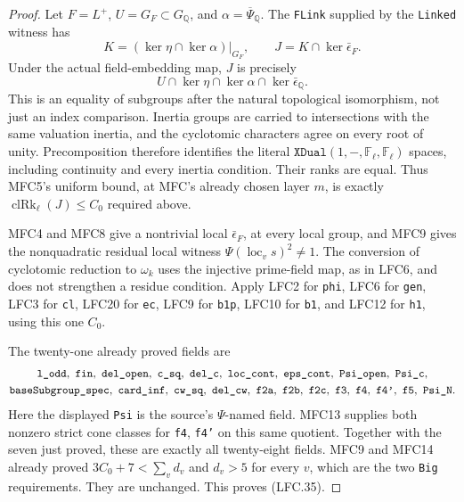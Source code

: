 \documentclass[11pt,a4paper]{article}
\numberwithin{equation}{section}
\theoremstyle{remark}\newtheorem{remark}[theorem]{Remark}
\begin{document}
\begin{proof}
Let \(F=L^+\), \(U=G_F\subset G_{\mathbb Q}\), and
\(\alpha=\overline\Psi_{\mathbb Q}\).
The \texttt{FLink} supplied by the \texttt{Linked} witness
has
\[
 K=(\ker\eta\cap\ker\alpha)|_{G_F},\qquad
 J=K\cap\ker\bar\epsilon_F.
 \]
Under the actual field-embedding map, \(J\) is precisely
\[
     U\cap\ker\eta\cap\ker\alpha\cap\ker\bar\epsilon_{\mathbb Q}.
                                                        \tag{LFC.36}
\]
This is an equality of subgroups after the natural
topological isomorphism, not just an index comparison.
Inertia groups are carried to intersections with the
same valuation inertia, and the cyclotomic characters
agree on every root of unity.  Precomposition therefore
identifies the literal \(\texttt{XDual}(1,-,\mathbb F_\ell,
\mathbb F_\ell)\) spaces, including continuity and
every inertia condition.
Their ranks are equal.  Thus MFC5's uniform bound,
at MFC's already chosen layer \(m\), is exactly
\(\operatorname{clRk}_\ell(J)\le C_0\) required above.

MFC4 and MFC8 give a nontrivial local
\(\bar\epsilon_F\), at every local group, and MFC9
gives the nonquadratic residual local witness
\(\Psi(\operatorname{loc}_v s)^2\ne1\).
The conversion of cyclotomic reduction to
\(\omega_k\) uses the injective prime-field map,
as in LFC6, and does not strengthen a residue condition.
Apply LFC2 for \texttt{phi}, LFC6 for \texttt{gen},
LFC3 for \texttt{cl}, LFC20 for \texttt{ec},
LFC9 for \texttt{b1p}, LFC10 for \texttt{b1},
and LFC12 for \texttt{h1}, using this one \(C_0\).

The twenty-one already proved fields are
\[
 \begin{gathered}
 \texttt{l\_\allowbreak odd},\ \texttt{fin},\ \texttt{del\_\allowbreak open},\
 \texttt{c\_\allowbreak sq},\ \texttt{del\_\allowbreak c},\ \texttt{loc\_\allowbreak cont},\
 \texttt{eps\_\allowbreak cont},\ \texttt{Psi\_\allowbreak open},\ \texttt{Psi\_\allowbreak c},\\
 \texttt{base\allowbreak Subgroup\_\allowbreak spec},\ \texttt{card\_\allowbreak inf},\
 \texttt{cw\_\allowbreak sq},\ \texttt{del\_\allowbreak cw},\
 \texttt{f2a},\ \texttt{f2b},\ \texttt{f2c},\
 \texttt{f3},\ \texttt{f4},\ \texttt{f4'},\
 \texttt{f5},\ \texttt{Psi\_\allowbreak N}.
 \end{gathered}
 \]
Here the displayed \texttt{Psi} is the source's
\(\Psi\)-named field.  MFC13 supplies both nonzero
strict cone classes for \texttt{f4}, \texttt{f4'} on
this same quotient.  Together with the seven just
proved, these are exactly all twenty-eight fields.
MFC9 and MFC14 already proved
\(3C_0+7<\sum_v d_v\) and \(d_v>5\) for every \(v\),
which are the two \texttt{Big} requirements.
They are unchanged.  This proves (LFC.35).
\end{proof}
\end{document}

